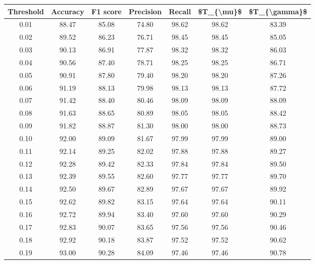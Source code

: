 \begin{tabular}{|c|c|c|c|c|c|c|}
\hline
 Threshold &  Accuracy &  F1 score &  Precision &  Recall &  \$T\_\{\textbackslash mu\}\$ &  \$T\_\{\textbackslash gamma\}\$ \\
\hline
      0.01 &     88.47 &     85.08 &      74.80 &   98.62 &      98.62 &         83.39 \\
      0.02 &     89.52 &     86.23 &      76.71 &   98.45 &      98.45 &         85.05 \\
      0.03 &     90.13 &     86.91 &      77.87 &   98.32 &      98.32 &         86.03 \\
      0.04 &     90.56 &     87.40 &      78.71 &   98.25 &      98.25 &         86.71 \\
      0.05 &     90.91 &     87.80 &      79.40 &   98.20 &      98.20 &         87.26 \\
      0.06 &     91.19 &     88.13 &      79.98 &   98.13 &      98.13 &         87.72 \\
      0.07 &     91.42 &     88.40 &      80.46 &   98.09 &      98.09 &         88.09 \\
      0.08 &     91.63 &     88.65 &      80.89 &   98.05 &      98.05 &         88.42 \\
      0.09 &     91.82 &     88.87 &      81.30 &   98.00 &      98.00 &         88.73 \\
      0.10 &     92.00 &     89.09 &      81.67 &   97.99 &      97.99 &         89.00 \\
      0.11 &     92.14 &     89.25 &      82.02 &   97.88 &      97.88 &         89.27 \\
      0.12 &     92.28 &     89.42 &      82.33 &   97.84 &      97.84 &         89.50 \\
      0.13 &     92.39 &     89.55 &      82.60 &   97.77 &      97.77 &         89.70 \\
      0.14 &     92.50 &     89.67 &      82.89 &   97.67 &      97.67 &         89.92 \\
      0.15 &     92.62 &     89.82 &      83.15 &   97.64 &      97.64 &         90.11 \\
      0.16 &     92.72 &     89.94 &      83.40 &   97.60 &      97.60 &         90.29 \\
      0.17 &     92.83 &     90.07 &      83.65 &   97.56 &      97.56 &         90.46 \\
      0.18 &     92.92 &     90.18 &      83.87 &   97.52 &      97.52 &         90.62 \\
      0.19 &     93.00 &     90.28 &      84.09 &   97.46 &      97.46 &         90.78 \\

\end{tabular}
